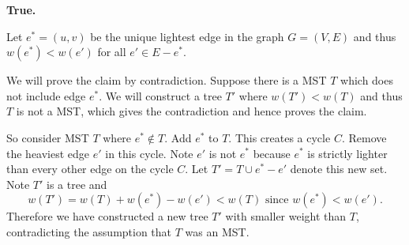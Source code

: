 \documentclass[12pt]{amsart}
\theoremstyle{plain}
\theoremstyle{definition}
\theoremstyle{remark}
\begin{document}
\begin{tcolorbox}
	{\bf True.}
	
	Let $e^*=(u,v)$ be the unique lightest edge in the graph $G=(V,E)$ and 
	thus $w(e^*)<w(e')$ for all $e'\in E-e^*$.  
	
	We will prove the claim by contradiction.  Suppose there is a MST $T$ which does
	not include edge $e^*$.  We will construct a tree $T'$ where $w(T')<w(T)$ and thus
	$T$ is not a MST, which gives the contradiction and hence proves the claim.
	
	So consider MST $T$ where $e^*\notin T$.   Add $e^*$ to $T$.  
	This creates a cycle $C$.  Remove the heaviest edge $e'$ in this cycle.  
	Note $e'$ is not $e^*$ because $e^*$ is strictly 
	lighter than every other edge on the cycle $C$.
	Let $T' = T\cup e^* - e'$ denote this new set.  Note $T'$ is a tree and 
	\[ w(T') = w(T) + w(e^*) - w(e') < w(T) \mbox{ since } w(e^*) < w(e').
	\] Therefore we have constructed a new tree $T'$ with smaller weight than $T$,  
	contradicting the assumption that $T$ was an MST.
\end{tcolorbox}
\end{document}
